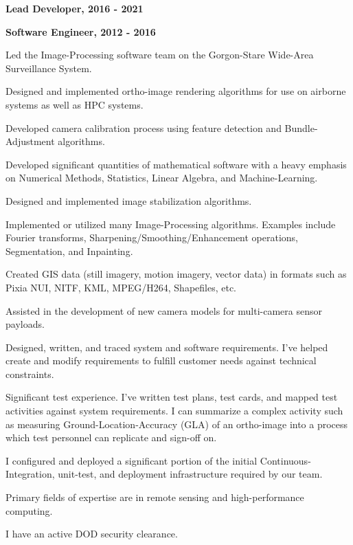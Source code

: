 \documentclass[10pt]{article}
\newenvironment{outerlist}[1][\enskip\textbullet]%
        {\begin{itemize}[#1]}{\end{itemize}%
         \vspace{-.6\baselineskip}}
\newenvironment{innerlist}[1][\enskip\textbullet]%
        {\begin{compactitem}[#1]}{\end{compactitem}}
\begin{document}
\begin{outerlist}
         \item \textbf{Lead Developer, 2016 - 2021}
         \item \textbf{Software Engineer, 2012 - 2016} 
         \begin{innerlist}
            \item Led the Image-Processing software team on the Gorgon-Stare Wide-Area Surveillance System.
            \item Designed and implemented ortho-image rendering algorithms for use on airborne systems as well as HPC systems.
            \item Developed camera calibration process using feature detection and Bundle-Adjustment algorithms.
            \item Developed significant quantities of mathematical software with a heavy emphasis on Numerical Methods, Statistics, Linear Algebra, and Machine-Learning.
            \item Designed and implemented image stabilization algorithms.
            \item Implemented or utilized many Image-Processing algorithms. Examples include Fourier transforms, Sharpening/Smoothing/Enhancement operations, Segmentation, and Inpainting.
            \item Created GIS data (still imagery, motion imagery, vector data) in formats
                  such as Pixia NUI, NITF, KML, MPEG/H264, Shapefiles, etc.
            \item Assisted in the development of new camera models for multi-camera sensor payloads.
            \item Designed, written, and traced system and software requirements.  I've helped create and modify requirements to fulfill customer needs against technical constraints.
            \item Significant test experience.  I've written test plans, test cards, and mapped test activities against system requirements. I can summarize a complex activity such as measuring Ground-Location-Accuracy (GLA) of an ortho-image into a process which test personnel can replicate and sign-off on.
         \item I configured and deployed a significant portion of the initial Continuous-Integration, unit-test, and deployment infrastructure 
               required by our team.
         \end{innerlist}
         \item Primary fields of expertise are in remote sensing and high-performance computing. 
         \item I have an active DOD security clearance.\\
     \end{outerlist}
\end{document}
